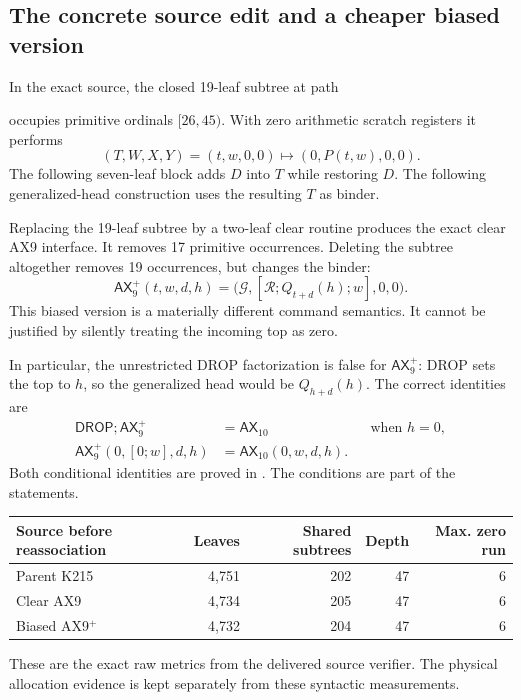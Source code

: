 \documentclass[11pt]{article}
\newcommand{\AX}{\mathsf{AX}}
\newcommand{\DROP}{\mathsf{DROP}}
\newcommand{\code}[1]{\texttt{\detokenize{#1}}}
\begin{document}
\subsection{The concrete source edit and a cheaper biased version}

In the exact source, the closed 19-leaf subtree at path
\begin{center}\code{11010010010000}\end{center}
occupies primitive ordinals $[26,45)$. With zero arithmetic scratch registers it performs
\[
 (T,W,X,Y)=(t,w,0,0)\longmapsto(0,P(t,w),0,0).
\]
The following seven-leaf block adds $D$ into $T$ while restoring $D$. The following generalized-head construction uses the resulting $T$ as binder.

Replacing the 19-leaf subtree by a two-leaf clear routine produces the exact clear AX9 interface. It removes 17 primitive occurrences. Deleting the subtree altogether removes 19 occurrences, but changes the binder:
\[
 \AX_9^+(t,w,d,h)
   =\bigl(\mathcal G,[\mathcal R;Q_{t+d}(h);w],0,0\bigr).
\]
This biased version is a materially different command semantics. It cannot be justified by silently treating the incoming top as zero.

In particular, the unrestricted DROP factorization is false for $\AX_9^+$: DROP sets the top to $h$, so the generalized head would be $Q_{h+d}(h)$. The correct identities are
\begin{align*}
 \DROP;\AX_9^+ &= \AX_{10} &&\text{when }h=0,\\
 \AX_9^+(0,[0;w],d,h)&=\AX_{10}(0,w,d,h).&&
\end{align*}
Both conditional identities are proved in \code{AX9Factor.v}. The conditions are part of the statements.

\begin{center}
\begin{tabular}{@{}lrrrr@{}}
\toprule
Source before reassociation & Leaves & Shared subtrees & Depth & Max. zero run\\
\midrule
Parent K215 &4,751&202&47&6\\
Clear AX9 &4,734&205&47&6\\
Biased AX9$^+$ &4,732&204&47&6\\
\bottomrule
\end{tabular}
\end{center}
These are the exact raw metrics from the delivered source verifier. The physical allocation evidence is kept separately from these syntactic measurements.
\end{document}
